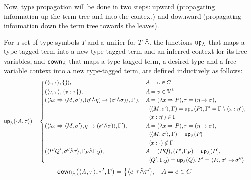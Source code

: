 \documentclass[main.tex]{subfiles}
\begin{document}
Now, type propagation will be done in two steps: upward (propagating
information up the term tree and into the context) and downward (propagating
information down the term tree towards the leaves).

\begin{defn}
    \label{def:propagation}
    For a set of type symbols $T$ and a unifier for $T$ $\hat{\wedge}$, the functions
    $\mathsf{up}_{\hat{\wedge}}$ that maps a type-tagged term into a new type-tagged term and
    an inferred context for its free variables, and $\mathsf{down}_{\hat{\wedge}}$ that maps
    a type-tagged term, a desired type and a free variable context into a
    new type-tagged term, are defined inductively as follows:
    \[
        \mcf{up}_{\unify}(\ttt{A}{\tau}) =
        \begin{cases*}
            (\ttt{c}{\tau}, \{ \}) ,& $A = c \in C$ \\
            (\ttt{v}{\tau}, \{ v : \tau \}) ,& $A = v \in \lvars$ \\
            (\ttt{\lambda x \abstr \ttt{M}{\sigma'}}{(\eta' \unify \eta) \tot (\sigma' \unify \sigma)}, \Gamma')
 ,& $A = (\lambda x \abstr P)
                , \tau = (\eta \tot \sigma),$ \\
                \phantom{} &\phantom{, }$(\ttt{M}{\sigma'}, \Gamma) = \mcf{up}_{\unify}(P)
                , \Gamma' = \Gamma \setminus (x : \eta'),$ \\
                \phantom{} &\phantom{, }$(x : \eta') \in \Gamma$ \\
            (\ttt{\lambda x \abstr \ttt{M}{\sigma'}}{\eta \tot (\sigma' \unify \sigma)}, \Gamma')
 ,& $A = (\lambda x \abstr P)
                , \tau = (\eta \tot \sigma),$ \\
                \phantom{} &\phantom{, }$(\ttt{M}{\sigma'}, \Gamma) = \mcf{up}_{\unify}(P)$ \\
                \phantom{} &\phantom{, }$(x : \cdot) \not\in \Gamma$ \\
            (\ttt{P' Q'}{\sigma'' \unify \tau}, \Gamma_P \unify \Gamma_Q)
 ,& $A = (PQ), (P', \Gamma_P) = \mcf{up}_{\unify}(P),$ \\
                \phantom{} &\phantom{, }$(Q', \Gamma_Q) = \mcf{up}_{\unify}(Q), P' = \ttt{M}{\sigma' \tot \sigma''}$ \\
        \end{cases*}
    \]
    \[
        \mcf{down}_{\unify}(\ttt{A}{\tau}, \tau', \Gamma) =
        \begin{cases*}
            \ttt{c}{\tau \unify \tau'} ,& $A = c \in C$ \\

\end{cases*}\]
\end{defn}
\end{document}
